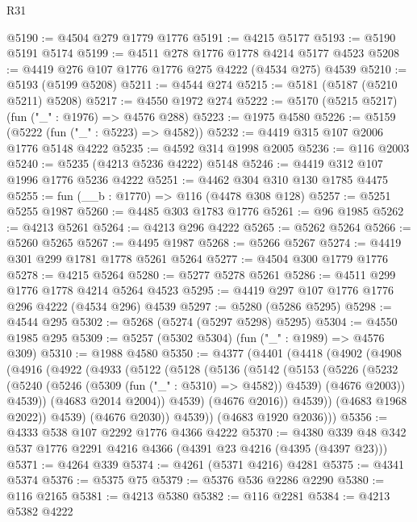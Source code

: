 \begin{lexlean}{R31}
\begin{coremodule}
@5190 := @4504 @279 @1779 @1776
@5191 := @4215 @5177
@5193 := @5190 @5191 @5174
@5199 := @4511 @278 @1776 @1778 @4214 @5177 @4523
@5208 := @4419 @276 @107 @1776 @1776 @275 @4222 (@4534 @275) @4539
@5210 := @5193 (@5199 @5208)
@5211 := @4544 @274
@5215 := @5181 (@5187 (@5210 @5211) @5208)
@5217 := @4550 @1972 @274
@5222 := @5170 (@5215 @5217) (fun ("_" : @1976) => @4576 @288)
@5223 := @1975 @4580
@5226 := @5159 (@5222 (fun ("_" : @5223) => @4582))
@5232 := @4419 @315 @107 @2006 @1776 @5148 @4222
@5235 := @4592 @314 @1998 @2005
@5236 := @116 @2003
@5240 := @5235 (@4213 @5236 @4222) @5148
@5246 := @4419 @312 @107 @1996 @1776 @5236 @4222
@5251 := @4462 @304 @310 @130 @1785 @4475
@5255 := fun (__b : @1770) => @116 (@4478 @308 @128)
@5257 := @5251 @5255 @1987
@5260 := @4485 @303 @1783 @1776
@5261 := @96 @1985
@5262 := @4213 @5261
@5264 := @4213 @296 @4222
@5265 := @5262 @5264
@5266 := @5260 @5265
@5267 := @4495 @1987
@5268 := @5266 @5267
@5274 := @4419 @301 @299 @1781 @1778 @5261 @5264
@5277 := @4504 @300 @1779 @1776
@5278 := @4215 @5264
@5280 := @5277 @5278 @5261
@5286 := @4511 @299 @1776 @1778 @4214 @5264 @4523
@5295 := @4419 @297 @107 @1776 @1776 @296 @4222 (@4534 @296) @4539
@5297 := @5280 (@5286 @5295)
@5298 := @4544 @295
@5302 := @5268 (@5274 (@5297 @5298) @5295)
@5304 := @4550 @1985 @295
@5309 := @5257 (@5302 @5304) (fun ("_" : @1989) => @4576 @309)
@5310 := @1988 @4580
@5350 := @4377
    (@4401
      (@4418
        (@4902
          (@4908
            (@4916
              (@4922
                (@4933
                  (@5122
                    (@5128
                      (@5136
                        (@5142
                          (@5153
                            (@5226
                              (@5232
                                (@5240
                                  (@5246 (@5309 (fun ("_" : @5310) => @4582)) @4539)
                                  (@4676 @2003))
                                @4539))
                            (@4683 @2014 @2004))
                          @4539)
                        (@4676 @2016))
                      @4539))
                  (@4683 @1968 @2022))
                @4539)
              (@4676 @2030))
            @4539))
        (@4683 @1920 @2036)))
@5356 := @4333 @538 @107 @2292 @1776 @4366 @4222
@5370 := @4380 @339 @48 @342 @537 @1776 @2291 @4216 @4366 (@4391 @23 @4216 (@4395 (@4397 @23)))
@5371 := @4264 @339
@5374 := @4261 (@5371 @4216) @4281
@5375 := @4341 @5374
@5376 := @5375 @75
@5379 := @5376 @536 @2286 @2290
@5380 := @116 @2165
@5381 := @4213 @5380
@5382 := @116 @2281
@5384 := @4213 @5382 @4222

\end{coremodule}
\end{lexlean}
